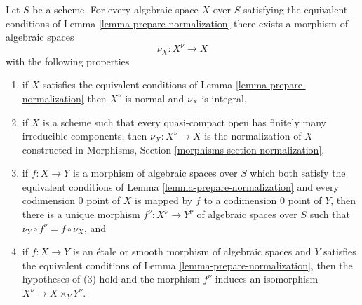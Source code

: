 %
\begin{lemma}
\label{lemma-normalization}
Let $S$ be a scheme. For every algebraic space $X$ over $S$ satisfying
the equivalent conditions of Lemma \ref{lemma-prepare-normalization}
there exists a morphism of algebraic spaces
$$
\nu_X : X^\nu \longrightarrow X
$$
with the following properties
\begin{enumerate}
\item if $X$ satisfies the equivalent conditions of
Lemma \ref{lemma-prepare-normalization} then
$X^\nu$ is normal and $\nu_X$ is integral,
\item if $X$ is a scheme such that every quasi-compact open has finitely
many irreducible components, then $\nu_X : X^\nu \to X$ is the
normalization of $X$ constructed in
Morphisms, Section \ref{morphisms-section-normalization},
\item if $f : X \to Y$ is a morphism of algebraic spaces over $S$
which both satisfy the equivalent conditions of
Lemma \ref{lemma-prepare-normalization} and every codimension $0$
point of $X$ is mapped by $f$ to a codimension $0$ point of $Y$, then
there is a unique morphism $f^\nu : X^\nu \to Y^\nu$ of algebraic
spaces over $S$ such that $\nu_Y \circ f^\nu = f \circ \nu_X$, and
\item if $f : X \to Y$ is an \'etale or smooth morphism of algebraic
spaces and $Y$ satisfies the equivalent conditions of
Lemma \ref{lemma-prepare-normalization}, then the hypotheses of (3)
hold and the morphism $f^\nu$ induces an isomorphism
$X^\nu  \to X \times_Y Y^\nu$.
\end{enumerate}
\end{lemma}

